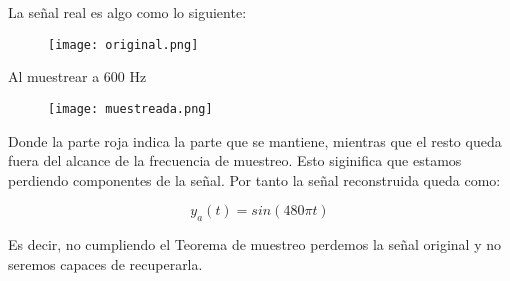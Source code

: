 \documentclass[11pt,a4paper]{article}
\begin{document}
\begin{enumerate}[a)]
	La señal real es algo como lo siguiente:
	
	\begin{figure}[H]
		\centering
		\texttt{[image: original.png]}
	\end{figure}
	
	Al muestrear a 600 Hz 
	
	\begin{figure}[H]
		\centering
		\texttt{[image: muestreada.png]}
	\end{figure}
	
	Donde la parte roja indica la parte que se mantiene, mientras que el resto queda fuera del alcance de la frecuencia de muestreo. Esto siginifica que estamos perdiendo componentes de la señal. Por tanto la señal reconstruida queda como:
	
	\[y_a(t) = sin(480\pi t)\]
	
	Es decir, no cumpliendo el Teorema de muestreo perdemos la señal original y no seremos capaces de recuperarla.
	
\end{enumerate}
\end{document}
